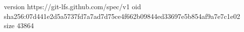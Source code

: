 version https://git-lfs.github.com/spec/v1
oid sha256:07d441e2d5a5737fd7a7ad7d75ce4f662b09844ed33697e5b854af9a7e7c1e02
size 43864
